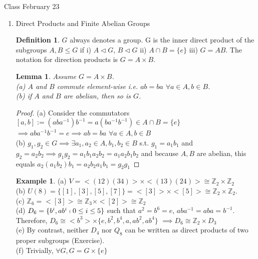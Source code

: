 \documentclass[11pt]{article}
\newtheorem{lem}[thm]{Lemma}
\theoremstyle{definition}
\newtheorem{definition}[thm]{Definition}
\newtheorem{example}[thm]{Example}
\numberwithin{equation}{section}
\newcommand{\Z}{\mathbb{Z}}
\begin{document}
\begin{center}
{\sf\LARGE Class February 23}
\end{center}

\begin{enumerate} %

\item Direct Products and Finite Abelian Groups
\begin{definition}
$G$ always denotes a group. G is the inner direct product of the subgroups $A, B \leq G$ if i) $A \vartriangleleft G$, $B \vartriangleleft G$ ii) $A \cap B = \{e\}$ iii) $G = AB$. The notation for direction products is $G = A \times B$.
\end{definition}
\begin{lem}
Assume $G = A \times B$. \\
(a) $A$ and $B$ commute element-wise i.e. $ab = ba$ $\forall a \in A, b \in B$.\\
(b) if $A$ and $B$ are abelian, then so is $G$.
\end{lem}
\begin{proof}
(a) Consider the commutators $[a, b] := (aba^{-1})b^{-1} = a(ba^{-1}b^{-1}) \in A \cap B = \{e\}$\\
$\implies aba^{-1}b^{-1} = e \implies ab = ba$ $\forall a \in A, b \in B$\\
(b) $g_1, g_2 \in G \implies \exists a_1, a_2 \in A, b_1, b_2 \in B$ s.t. $g_1 = a_{1}b_{1}$ and $g_2 = a_{2}b_{2} \implies g_{1}g_{2} = a_{1}b_{1}a_{2}b_{2} = a_{1}a_{2}b_{1}b_{2}$ and because $A, B$ are abelian, this equals $a_{2}(a_{1}b_{2})b_{1} = a_{2}b_{2}a_{1}b_{1} = g_{2}g_{1}$
\end{proof}
\begin{example}
(a) $V = <(12)(34)> \times <(13)(24)> \cong \Z_2 \times \Z_2 $\\
(b) $U(8) = \{[1], [3], [5], [7]\} = <[3]> \times <[5]> \cong \Z_2 \times \Z_2$.\\
(c) $\Z_6 = <[3]> \cong \Z_3 \times <[2]> \cong \Z_2$\\
(d) $D_6 = \{b^{i}, ab^{i} \shortmid 0 \leq i \leq 5 \}$ such that $a^{2} = b^{6} = e$, $aba^{-1} = aba = b^{-1}$. Therefore, $D_6 \cong <b^{3}> \times \{e, b^{2}, b^{4}, a, ab^{2}, ab^{4}\}$ $\implies D_6 \cong \Z_2 \times D_3$\\
(e) By contrast, neither $D_4$ nor $Q_8$ can be written as direct products of two proper subgroups (Exercise).\\
(f) Trivially, $\forall G, G = G \times \{e\}$

\end{example}
\end{enumerate}
\end{document}

